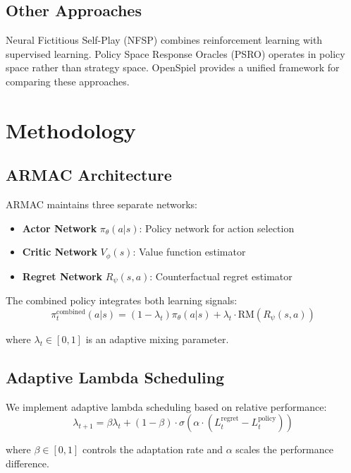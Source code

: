 \documentclass{icml2024}
\begin{document}
\subsection{Other Approaches}
Neural Fictitious Self-Play (NFSP) \cite{heinrich2015deep} combines reinforcement learning with supervised learning. Policy Space Response Oracles (PSRO) \cite{waugh2021deep} operates in policy space rather than strategy space. OpenSpiel \cite{lanctot2019openspiel} provides a unified framework for comparing these approaches.

\section{Methodology}

\subsection{ARMAC Architecture}

ARMAC maintains three separate networks:
\begin{itemize}
\item \textbf{Actor Network} $\pi_\theta(a|s)$: Policy network for action selection
\item \textbf{Critic Network} $V_\phi(s)$: Value function estimator
\item \textbf{Regret Network} $R_\psi(s,a)$: Counterfactual regret estimator
\end{itemize}

The combined policy integrates both learning signals:
\begin{equation}
\pi^{\text{combined}}_t(a|s) = (1 - \lambda_t)\pi_\theta(a|s) + \lambda_t \cdot \text{RM}(R_\psi(s,a))
\end{equation}

where $\lambda_t \in [0,1]$ is an adaptive mixing parameter.

\subsection{Adaptive Lambda Scheduling}

We implement adaptive lambda scheduling based on relative performance:
\begin{equation}
\lambda_{t+1} = \beta \lambda_t + (1-\beta) \cdot \sigma(\alpha \cdot (L^{\text{regret}}_t - L^{\text{policy}}_t))
\end{equation}

where $\beta \in [0,1]$ controls the adaptation rate and $\alpha$ scales the performance difference.
\end{document}
